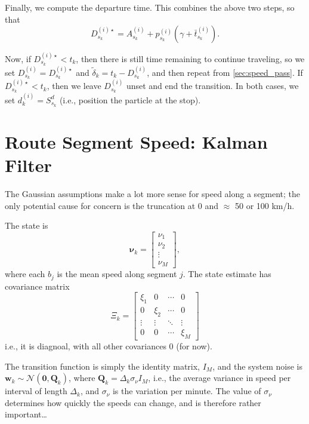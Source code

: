 \documentclass[14paper,twoside]{article}
\newcommand{\bnu}{\boldsymbol{\nu}}
\newcommand{\bw}{\mathbf{w}}
\newcommand{\bQ}{\mathbf{Q}}
\begin{document}
Finally, we compute the departure time.
This combines the above two steps, so that 
\begin{equation}
  \label{eq:departure_time}
  D_{s_k}^{(i)\star} = A_{s_k}^{(i)} + p_{s_k}^{(i)} \left( \gamma + \bar t_{s_k}^{(i)} \right).
\end{equation}

Now, if $D_{s_k}^{(i)\star} < t_k$, then there is still time remaining to continue traveling,
so we set $D_{s_k}^{(i)} = D_{s_k}^{(i)\star}$ and $\tilde\delta_k = t_k - D_{s_k}^{(i)}$,
and then repeat from \cref{sec:speed_pass}.
If $D_{s_k}^{(i)\star} < t_k$, then we leave $D_{s_k}^{(i)}$ unset and end the transition.
In both cases, we set $d_k^{(i)} = S_{s_k}^d$ (i.e., position the particle at the stop).


\section{Route Segment Speed: Kalman Filter}
\label{sec:speed}


The Gaussian assumptions make a lot more sense for speed along a segment;
the only potential cause for concern is the truncation at 0
and $\approx$ 50 or 100 km/h.

The state is
\begin{equation}
  \label{eq:speed_state}
  \bnu_k = 
  \begin{bmatrix}
    \nu_1 \\ \nu_2 \\ \vdots \\ \nu_M
  \end{bmatrix},
\end{equation}
where each $b_j$ is the mean speed along segment $j$.
The state estimate has covariance matrix 
\begin{equation}
  \label{eq:state_cov}
  \Xi_k = 
  \begin{bmatrix}
    \xi_1 & 0 & \cdots & 0 \\
    0 & \xi_2 & \cdots & 0 \\
    \vdots & \vdots & \ddots & \vdots \\
    0 & 0 & \cdots & \xi_M
  \end{bmatrix}
\end{equation}
i.e., it is diagnoal, with all other covariances 0 (for now).

The transition function is simply the identity matrix, $I_M$,
and the system noise is $\bw_k \sim \mathcal{N}(\mathbf{0}, \bQ_k)$,
where $\bQ_k = \Delta_k \sigma_\nu I_M$,
i.e., the average variance in speed per interval of length $\Delta_k$,
and $\sigma_\nu$ is the variation per minute.
The value of $\sigma_\nu$ determines how quickly the speeds can change,
and is therefore rather important\ldots
\end{document}
